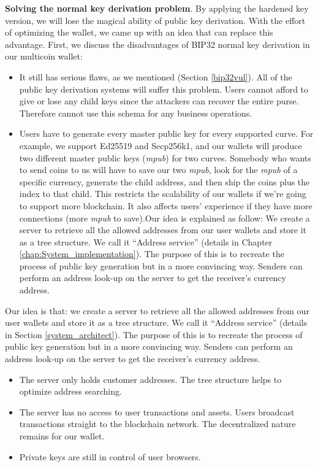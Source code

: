 \bigskip
{\textbf{Solving the normal key derivation problem}}. By applying the hardened key version, we will lose the magical ability of public key derivation. With the effort of optimizing the wallet, we came up with an idea that can replace this advantage. First, we discuss the disadvantages of BIP32 normal key derivation in our multicoin wallet:

\begin{itemize}
    \item It still has serious flaws, as we mentioned (Section \ref{bip32vul}). All of the public key derivation systems will suffer this problem. Users cannot afford to give or lose any child keys since the attackers can recover the entire purse. Therefore cannot use this schema for any business operations.

    \item Users have to generate every master public key for every supported curve. For example, we support Ed25519 and Secp256k1, and our wallets will produce two different master public keys (\textit{mpub}) for two curves. Somebody who wants to send coins to us will have to save our two \textit{mpub}, look for the \textit{mpub} of a specific currency, generate the child address, and then ship the coins plus the index to that child. This restricts the scalability of our wallets if we're going to support more blockchain. It also affects users' experience if they have more connections (more \textit{mpub} to save).Our idea is explained as follow:
            We create a server to retrieve all the allowed addresses from our user wallets and store it as a tree structure. We call it “Address service” (details in Chapter \ref{chap:System_implementation}). The purpose of this is to recreate the process of public key generation but in a more convincing way. Senders can perform an address look-up on the server to get the receiver’s currency address.

\end{itemize}

Our idea is that: we create a server to retrieve all the allowed addresses from our user wallets and store it as a tree structure. We call it “Address service” (details in Section \ref{system_architect}). The purpose of this is to recreate the process of public key generation but in a more convincing way. Senders can perform an address look-up on the server to get the receiver’s currency address.

\begin{itemize}
    \item The server only holds customer addresses. The tree structure helps to optimize address searching.
    \item The server has no access to user transactions and assets. Users broadcast transactions straight to the blockchain network. The decentralized nature remains for our wallet.
    \item Private keys are still in control of user browsers.
\end{itemize}

